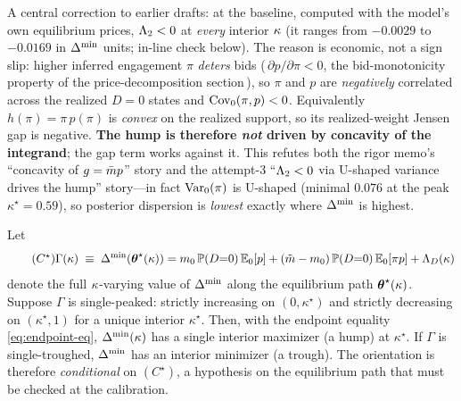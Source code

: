 \begin{remark}
\label{rem:hvsg}
A central correction to earlier drafts: at the baseline, computed with the
model's own equilibrium prices, $\Lambda_2<0$ at \emph{every} interior $\kappa$ (it
ranges from $-0.0029$ to $-0.0169$ in $\Delta^{\min}$ units; in-line check below). The
reason is economic, not a sign slip: higher inferred engagement $\pi$
\emph{deters} bids (\,$\partial p/\partial\pi<0$, the bid-monotonicity property of
the price-decomposition section\,), so $\pi$ and $p$ are \emph{negatively}
correlated across the realized $D=0$ states and $\mathrm{Cov}_0(\pi,p)<0$. Equivalently
$h(\pi)=\pi\,p(\pi)$ is \emph{convex} on the realized support, so its
realized-weight Jensen gap is negative. \textbf{The hump is therefore \emph{not}
driven by concavity of the integrand}; the gap term works against it. This
refutes both the rigor memo's ``concavity of $g=\bar{m} p$'' story and the
attempt-3 ``$\Lambda_2<0$ via U-shaped variance drives the hump'' story---in fact
$\mathrm{Var}_0(\pi)$ is U-shaped (minimal $0.076$ at the peak $\kappa^\star=0.59$), so
posterior dispersion is \emph{lowest} exactly where $\Delta^{\min}$ is highest.
\end{remark}

\begin{proposition}
\label{prop:hump}
Let
\begin{equation}
\label{eq:Cstar}
\tag{$C^\star$}
\Gamma(\kappa)\;\equiv\;\Delta^{\min}(\boldsymbol{\theta}^{\star}(\kappa))
=m_0\,\mathbb{P}(D{=}0)\,\mathbb{E}_0[p]+(\tilde{m}-m_0)\,\mathbb{P}(D{=}0)\,\mathbb{E}_0[\pi p]+\Lambda_D(\kappa)
\end{equation}
denote the full $\kappa$-varying value of $\Delta^{\min}$ along the equilibrium path
$\boldsymbol{\theta}^{\star}(\kappa)$. Suppose $\Gamma$ is single-peaked: strictly increasing on
$(0,\kappa^\star)$ and strictly decreasing on $(\kappa^\star,1)$ for a unique
interior $\kappa^\star$. Then, with the endpoint equality \eqref{eq:endpoint-eq},
$\Delta^{\min}(\kappa)$ has a single interior maximizer (a hump) at $\kappa^\star$. If
$\Gamma$ is single-troughed, $\Delta^{\min}$ has an interior minimizer (a trough). The
orientation is therefore \emph{conditional} on $(C^\star)$, a hypothesis on the
equilibrium path that must be checked at the calibration.
\end{proposition}

